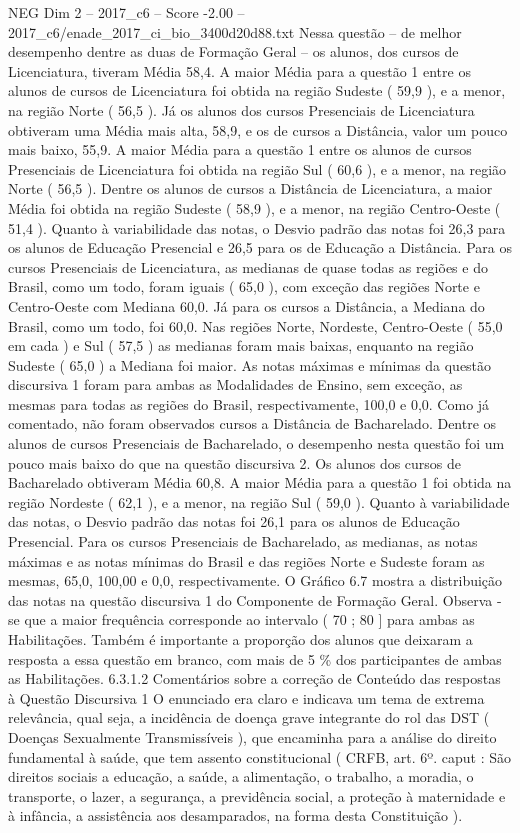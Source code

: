 \begin{textsample}{NEG Dim 2 – 2017\_c6 – Score -2.00 – 2017\_c6/enade\_2017\_ci\_bio\_3400d20d88.txt}
Nessa questão – de melhor desempenho dentre as duas de Formação Geral – os alunos, dos cursos de Licenciatura, tiveram Média 58,4.
A maior Média para a questão 1 entre os alunos de cursos de Licenciatura foi obtida na região Sudeste ( 59,9 ), e a menor, na região Norte ( 56,5 ).
Já os alunos dos cursos Presenciais de Licenciatura obtiveram uma Média mais alta, 58,9, e os de cursos a Distância, valor um pouco mais baixo, 55,9.
A maior Média para a questão 1 entre os alunos de cursos Presenciais de Licenciatura foi obtida na região Sul ( 60,6 ), e a menor, na região Norte ( 56,5 ).
Dentre os alunos de cursos a Distância de Licenciatura, a maior Média foi obtida na região Sudeste ( 58,9 ), e a menor, na região Centro-Oeste ( 51,4 ).
Quanto à variabilidade das notas, o Desvio padrão das notas foi 26,3 para os alunos de Educação Presencial e 26,5 para os de Educação a Distância.
Para os cursos Presenciais de Licenciatura, as medianas de quase todas as regiões e do Brasil, como um todo, foram iguais ( 65,0 ), com exceção das regiões Norte e Centro-Oeste com Mediana 60,0.
Já para os cursos a Distância, a Mediana do Brasil, como um todo, foi 60,0.
Nas regiões Norte, Nordeste, Centro-Oeste ( 55,0 em cada ) e Sul ( 57,5 ) as medianas foram mais baixas, enquanto na região Sudeste ( 65,0 ) a Mediana foi maior.
As notas máximas e mínimas da questão discursiva 1 foram para ambas as Modalidades de Ensino, sem exceção, as mesmas para todas as regiões do Brasil, respectivamente, 100,0 e 0,0.
Como já comentado, não foram observados cursos a Distância de Bacharelado.
Dentre os alunos de cursos Presenciais de Bacharelado, o desempenho nesta questão foi um pouco mais baixo do que na questão discursiva 2.
Os alunos dos cursos de Bacharelado obtiveram Média 60,8.
A maior Média para a questão 1 foi obtida na região Nordeste ( 62,1 ), e a menor, na região Sul ( 59,0 ).
Quanto à variabilidade das notas, o Desvio padrão das notas foi 26,1 para os alunos de Educação Presencial.
Para os cursos Presenciais de Bacharelado, as medianas, as notas máximas e as notas mínimas do Brasil e das regiões Norte e Sudeste foram as mesmas, 65,0, 100,00 e 0,0, respectivamente.
O Gráfico 6.7 mostra a distribuição das notas na questão discursiva 1 do Componente de Formação Geral.
Observa -se que a maior frequência corresponde ao intervalo ( 70 ; 80 ] para ambas as Habilitações.
Também é importante a proporção dos alunos que deixaram a resposta a essa questão em branco, com mais de 5 \% dos participantes de ambas as Habilitações. 6.3.1.2 Comentários sobre a correção de Conteúdo das respostas à Questão Discursiva 1 O enunciado era claro e indicava um tema de extrema relevância, qual seja, a incidência de doença grave integrante do rol das DST ( Doenças Sexualmente Transmissíveis ), que encaminha para a análise do direito fundamental à saúde, que tem assento constitucional ( CRFB, art. 6º. caput : São direitos sociais a educação, a saúde, a alimentação, o trabalho, a moradia, o transporte, o lazer, a segurança, a previdência social, a proteção à maternidade e à infância, a assistência aos desamparados, na forma desta Constituição ).

\end{textsample}
